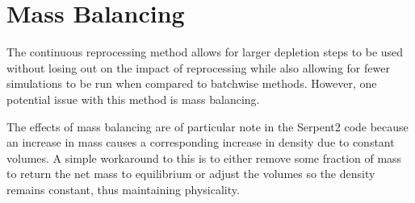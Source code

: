 






\section{Mass Balancing}

The continuous reprocessing method allows for larger depletion steps to be used without losing out on the impact of reprocessing while also allowing for fewer simulations to be run when compared to batchwise methods. However, one potential issue with this method is mass balancing. 

The effects of mass balancing are of particular note in the Serpent2 code because an increase in mass causes a corresponding increase in density due to constant volumes. A simple workaround to this is to either remove some fraction of mass to return the net mass to equilibrium or adjust the volumes so the density remains constant, thus maintaining physicality.

